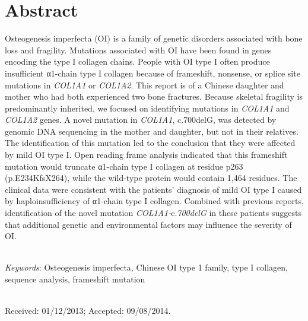 \section*{Abstract}
\par Osteogenesis imperfecta (OI) is a family of genetic disorders associated with
                    bone loss and fragility. Mutations associated with OI have been found in genes
                    encoding the type I collagen chains. People with OI type I often produce
                    insufficient α1-chain type I collagen because of frameshift, nonsense, or splice
                    site mutations in \textit{COL1A1} or \textit{COL1A2}. This
                    report is of a Chinese daughter and mother who had both experienced two bone
                    fractures. Because skeletal fragility is predominantly inherited, we focused on
                    identifying mutations in \textit{COL1A1} and \textit{COL1A2}
                    genes. A novel mutation in \textit{COL1A1}, c.700delG, was detected by
                    genomic DNA sequencing in the mother and daughter, but not in their relatives.
                    The identification of this mutation led to the conclusion that they were
                    affected by mild OI type I. Open reading frame analysis indicated that this
                    frameshift mutation would truncate α1-chain type I collagen at residue p263
                    (p.E234KfsX264), while the wild-type protein would contain 1,464 residues. The
                    clinical data were consistent with the patients’ diagnosis of mild OI type I
                    caused by haploinsufficiency of α1-chain type I collagen. Combined with previous
                    reports, identification of the novel mutation
                        \textit{COL1A1-}c.\textit{700delG} in these patients
                    suggests that additional genetic and environmental factors may influence the
                    severity of OI.

\par \noindent \\
\textit{Keywords}: Osteogenesis imperfecta, Chinese OI type 1 family, type I collagen, sequence analysis, frameshift mutation
\par \noindent \\
Received: 01/12/2013; Accepted: 09/08/2014.\par \noindent \\
